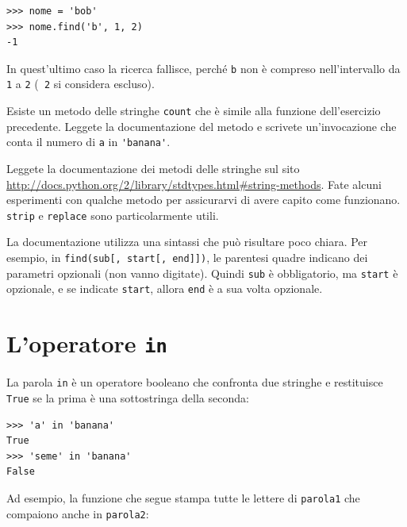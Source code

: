 \documentclass[10pt]{book}
\begin{document}
\begin{verbatim}
>>> nome = 'bob'
>>> nome.find('b', 1, 2)
-1
\end{verbatim}
%
In quest'ultimo caso la ricerca fallisce, perché {\tt b} non è compreso nell'intervallo da {\tt 1} a {\tt 2} ({\tt
2} si considera escluso).

\vspace{0.2in}
\begin{exercise}

Esiste un metodo delle stringhe {\tt count} che è simile alla funzione dell'esercizio precedente. Leggete la documentazione del metodo e scrivete un'invocazione che conta il numero di {\tt a} in \verb"'banana'".
\end{exercise}

\vspace{0.2in}
\begin{exercise}

Leggete la documentazione dei metodi delle stringhe sul sito
\url{http://docs.python.org/2/library/stdtypes.html#string-methods}.
Fate alcuni esperimenti con qualche metodo per assicurarvi di avere capito come funzionano. {\tt strip} e {\tt replace} sono particolarmente utili.

La documentazione utilizza una sintassi che può risultare poco chiara. Per esempio, in \verb"find(sub[, start[, end]])", le parentesi quadre indicano dei parametri opzionali (non vanno digitate). Quindi {\tt sub} è obbligatorio, ma
{\tt start} è opzionale, e se indicate {\tt start}, allora {\tt end} è a sua volta opzionale.
\end{exercise}


\section{L'operatore {\tt in}}
\label{inboth}

La parola {\tt in} è un operatore booleano che confronta due stringhe e restituisce {\tt True} se la prima è una sottostringa della seconda:

\begin{verbatim}
>>> 'a' in 'banana'
True
>>> 'seme' in 'banana'
False
\end{verbatim}
%
Ad esempio, la funzione che segue stampa tutte le lettere di {\tt parola1} che compaiono anche in {\tt parola2}:
\end{document}

